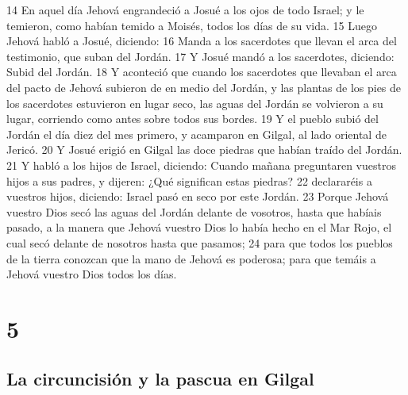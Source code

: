 14 En aquel día Jehová engrandeció a Josué a los ojos de todo Israel; y le temieron, como habían temido a Moisés, todos los días de su vida.
15 Luego Jehová habló a Josué, diciendo:
16 Manda a los sacerdotes que llevan el arca del testimonio, que suban del Jordán.
17 Y Josué mandó a los sacerdotes, diciendo: Subid del Jordán.
18 Y aconteció que cuando los sacerdotes que llevaban el arca del pacto de Jehová subieron de en medio del Jordán, y las plantas de los pies de los sacerdotes estuvieron en lugar seco, las aguas del Jordán se volvieron a su lugar, corriendo como antes sobre todos sus bordes.
19 Y el pueblo subió del Jordán el día diez del mes primero, y acamparon en Gilgal, al lado oriental de Jericó.
20 Y Josué erigió en Gilgal las doce piedras que habían traído del Jordán.
21 Y habló a los hijos de Israel, diciendo: Cuando mañana preguntaren vuestros hijos a sus padres, y dijeren: ¿Qué significan estas piedras?
22 declararéis a vuestros hijos, diciendo: Israel pasó en seco por este Jordán.
23 Porque Jehová vuestro Dios secó las aguas del Jordán delante de vosotros, hasta que habíais pasado, a la manera que Jehová vuestro Dios lo había hecho en el Mar Rojo, el cual secó delante de nosotros hasta que pasamos;
24 para que todos los pueblos de la tierra conozcan que la mano de Jehová es poderosa; para que temáis a Jehová vuestro Dios todos los días.

\chapter{5}

\section*{La circuncisión y la pascua en Gilgal}


